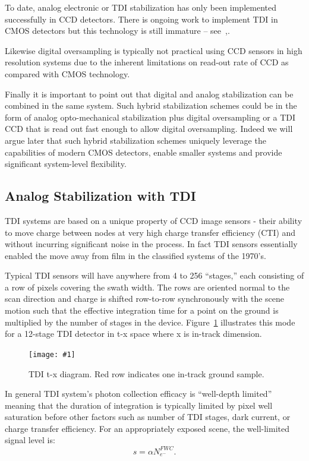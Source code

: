 \documentclass[]{spieman}  %
\newcommand{\includefigure}[3]
{
  \begin{figure}[h!tb]
  \centering
  \texttt{[image: \#1]}
  \caption[]{#3}
  \label{#2}
  \end{figure}
}
\begin{document}
To date, analog electronic or TDI stabilization has only been implemented successfully in CCD detectors.  There is ongoing work to implement TDI in CMOS detectors but this technology is still immature -- see~\cite{jerram},\cite{rushton}.

Likewise digital oversampling is typically not practical using CCD sensors in high resolution systems due to the inherent limitations on read-out rate of CCD as compared with CMOS technology.

Finally it is important to point out that digital and analog stabilization can be combined in the same system.  Such hybrid stabilization schemes could be in the form of analog opto-mechanical stabilization plus digital oversampling or a TDI CCD that is read out fast enough to allow digital oversampling.  Indeed we will argue later that such hybrid stabilization schemes uniquely leverage the capabilities of modern CMOS detectors, enable smaller systems and provide significant system-level flexibility.

\subsection{Analog Stabilization with TDI}

TDI systems are based on a unique property of CCD image sensors - their ability to move charge between nodes at very high charge transfer efficiency (CTI) and without incurring significant noise in the process.  In fact TDI sensors essentially enabled the move away from film in the classified systems of the 1970's.

Typical TDI sensors will have anywhere from 4 to 256 ``stages,'' each consisting of a row of pixels covering the swath width.  The rows are oriented normal to the scan direction and charge is shifted row-to-row synchronously with the scene motion such that the effective integration time for a point on the ground is multiplied by the number of stages in the device.  Figure~\ref{fig:tdi} illustrates this mode for a 12-stage TDI detector in t-x space where x is in-track dimension.

\includefigure{figures/tdi.pgf}{fig:tdi}{TDI t-x diagram.  Red row indicates one in-track ground sample.}

In general TDI system's photon collection efficacy is ``well-depth limited'' meaning that the duration of integration is typically limited by pixel well saturation before other factors such as number of TDI stages, dark current, or charge transfer efficiency.  For an appropriately exposed scene, the well-limited signal level is:
\begin{equation}
s = \alpha N_{e^-}^{FWC}
\label{eq:well_limited}.
\end{equation}
\end{document}
